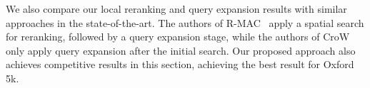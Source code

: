 \documentclass{sig-arxiv}
\begin{document}

We also compare our local reranking and query expansion results with similar approaches in the state-of-the-art. The authors of R-MAC~\cite{tolias2015} apply a spatial search for reranking, followed by a query expansion stage, while the authors of CroW~\cite{kalantidis2015} only apply query expansion after the initial search. Our proposed approach also achieves competitive results in this section, achieving the best result for Oxford 5k.
\end{document}
